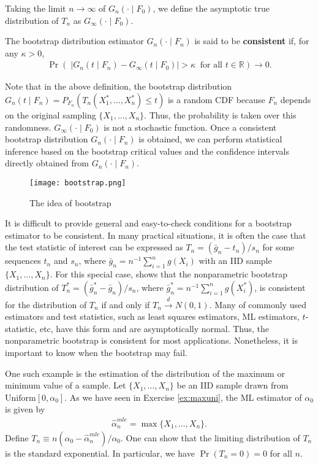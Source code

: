 \documentclass[11pt, A4paper, openany, uplatex]{book}
\begin{document}
Taking the limit $n \to \infty$ of $G_n(\cdot \mid F_0)$, we define the asymptotic true distribution of $T_n$ as $G_\infty(\cdot \mid F_0)$.
\begin{definition}
	The bootstrap distribution estimator $G_n(\cdot \mid F_n)$ is said to be \textbf{consistent} if, for any $\kappa > 0$,
	\begin{align*}
		\Pr \left(\; |G_n(t \mid F_n) - G_\infty( t \mid F_0)| > \kappa \;\; \text{for all } t \in \mathbb{R} \right) \to 0.
	\end{align*}
\end{definition}
Note that in the above definition, the bootstrap distribution $G_n(t \mid F_n) = P_{F_n}(T_n(X_1^*, \ldots, X_n^*) \le t)$ is a random CDF because $F_n$ depends on the original sampling $\{X_1, \ldots, X_n\}$.
Thus, the probability is taken over this randomness.
$G_\infty(\cdot \mid F_0)$ is not a stochastic function.
Once a consistent bootstrap distribution $G_n(\cdot \mid F_n)$ is obtained, we can perform statistical inference based on the bootstrap critical values and the confidence intervals directly obtained from $G_n(\cdot \mid F_n)$.

\begin{figure}[h!]
	\begin{center}
		\texttt{[image: bootstrap.png]}
		\caption{The idea of bootstrap}
	\end{center}
\end{figure}

It is difficult to provide general and easy-to-check conditions for a bootstrap estimator to be consistent.
In many practical situations, it is often the case that the test statistic of interest can be expressed as $T_n = (\bar g_n - t_n)/s_n$ for some sequences $t_n$ and $s_n$, where $\bar g_n = n^{-1}\sum_{i = 1}^n g(X_i)$ with an IID sample $\{X_1, \ldots, X_n\}$.
For this special case, \cite{mammen1992bootstrap} shows that the nonparametric bootstrap distribution of $T_n^* = (\bar g_n^* - \bar g_n)/s_n$, where $\bar g_n^* = n^{-1}\sum_{i = 1}^n g(X^*_i)$, is consistent for the distribution of $T_n$ if and only if $T_n \overset{d}{\to} N(0,1)$.
Many of commonly used estimators and test statistics, such as least squares estimators, ML estimators, $t$-statistic, etc, have this form and are asymptotically normal.
Thus, the nonparametric bootstrap is consistent for most applications.
Nonetheless, it is important to know when the bootstrap may fail.

One such example is the estimation of the distribution of the maximum or minimum value of a sample.
Let $\{X_1, \ldots, X_n\}$ be an IID sample drawn from $\mathrm{Uniform}[0, \alpha_0]$.
As we have seen in Exercise \ref{ex:maxuni}, the ML estimator of $\alpha_0$ is given by 
\begin{align*}
	\hat \alpha_n^{mle} = \max\{X_1, \ldots, X_n\}. 
\end{align*}
Define $T_n \equiv n(\alpha_0 - \hat \alpha_n^{mle})/\alpha_0$.
One can show that the limiting distribution of $T_n$ is the standard exponential.
In particular, we have $\Pr(T_n = 0) = 0$ for all $n$.
\end{document}
